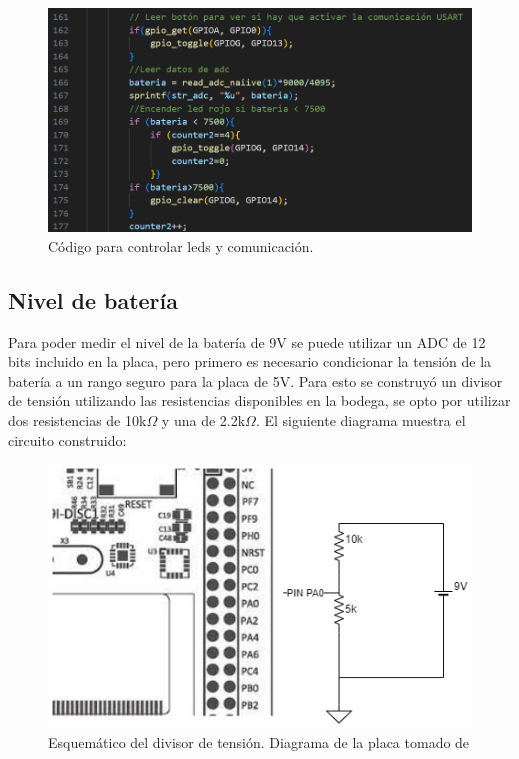 \begin{figure}[H]
    \centering
    \includegraphics[scale=.6]{Imagenes/codig3.png}
    \caption{Código para controlar leds y comunicación.}
    \label{codig3}
\end{figure}

\subsection{Nivel de batería}
Para poder medir el nivel de la batería de 9V se puede utilizar un ADC de 12 bits incluido en la placa, pero primero es necesario condicionar la tensión de la batería a un rango seguro para la placa de 5V. Para esto se construyó un divisor de tensión utilizando las resistencias disponibles en la bodega, se opto por utilizar dos resistencias de 10k$\Omega$ y una de 2.2k$\Omega$. El siguiente diagrama muestra el circuito construido:
\begin{figure}[H]
    \centering
    \includegraphics[scale=.7]{Imagenes/bateria (3).jpg}
    \caption{Esquemático del divisor de tensión. Diagrama de la placa tomado de \cite{discovery}}
    \label{fig:divisor}
\end{figure}

